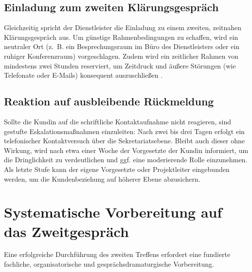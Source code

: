 \subsection{Einladung zum zweiten Klärungsgespräch}
Gleichzeitig spricht der Dienstleister die Einladung zu einem zweiten, zeitnahen Klärungsgespräch aus. Um günstige Rahmenbedingungen zu schaffen, wird ein neutraler Ort (z.~B. ein Besprechungsraum im Büro des Dienstleisters oder ein ruhiger Konferenzraum) vorgeschlagen. Zudem wird ein zeitlicher Rahmen von mindestens zwei Stunden reserviert, um Zeitdruck und äußere Störungen (wie Telefonate oder E-Mails) konsequent auszuschließen \cite[S.~50--52]{5}.

\subsection{Reaktion auf ausbleibende Rückmeldung}
Sollte die Kundin auf die schriftliche Kontaktaufnahme nicht reagieren, sind gestufte Eskalationsmaßnahmen einzuleiten: Nach zwei bis drei Tagen erfolgt ein telefonischer Kontaktversuch über die Sekretariatsebene. Bleibt auch dieser ohne Wirkung, wird nach etwa einer Woche der Vorgesetzte der Kundin informiert, um die Dringlichkeit zu verdeutlichen und ggf. eine moderierende Rolle einzunehmen. Als letzte Stufe kann der eigene Vorgesetzte oder Projektleiter eingebunden werden, um die Kundenbeziehung auf höherer Ebene abzusichern.

\section{Systematische Vorbereitung auf das Zweitgespräch}
Eine erfolgreiche Durchführung des zweiten Treffens erfordert eine fundierte fachliche, organisatorische und gesprächsdramaturgische Vorbereitung.

